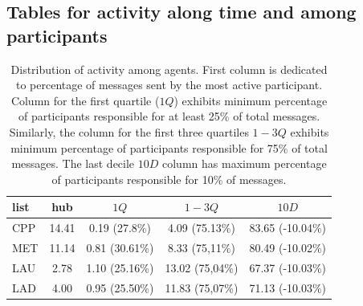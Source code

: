 \documentclass[%
 aip,
 jmp,%
 amsmath,amssymb,
 reprint,%
]{revtex4-1}
\begin{document}
\subsection{Tables for activity along time and among participants}\label{tabTime}

\begin{table}[!h]
    \caption{Distribution of activity among agents. First column is dedicated to percentage of messages sent by the most active participant. Column for the first quartile ($1Q$) exhibits minimum percentage of participants responsible for at least 25\% of total messages. Similarly, the column for the first three quartiles $1-3Q$ exhibits minimum percentage of participants responsible for 75\% of total messages. The last decile $10D$ column has maximum percentage of participants responsible for 10\% of messages.}
\begin{center}
    \begin{tabular}{ | l ||  c | c | c | c | }
        \hline
        list & hub & $ 1Q $ & $ 1-3Q $ & $10D$ \\ \hline
    CPP & 14.41 & 0.19 (27.8\%) & 4.09 (75.13\%) & 83.65 (-10.04\%)   \\ 
    MET & 11.14 & 0.81 (30.61\%) & 8.33 (75,11\%) & 80.49 (-10.02\%)  \\ 
    LAU & 2.78 & 1.10 (25.16\%) & 13.02 (75,04\%) & 67.37 (-10.03\%) \\ 
    LAD & 4.00 & 0.95 (25.50\%) & 11.83 (75,07\%) & 71.13 (-10.03\%) \\\hline
    \end{tabular}
\end{center}
\label{autores}
\end{table}
\end{document}
